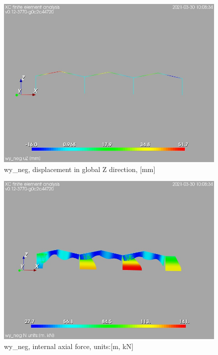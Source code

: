 \begin{figure}
\begin{center}
\includegraphics[width=\linewidth]{calc_results/sole_zeinali/text/graphics/resSimplLC/wy_negtotaluZ}
\caption{wy_neg, displacement in global Z direction, [mm]}
\end{center}
\end{figure}
\begin{figure}
\begin{center}
\includegraphics[width=\linewidth]{calc_results/sole_zeinali/text/graphics/resSimplLC/wy_negallMemberSetN}
\caption{wy_neg, internal axial force, units:[m, kN]}
\end{center}
\end{figure}
